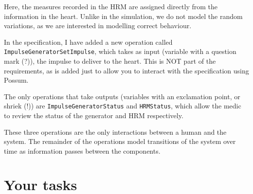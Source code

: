 \documentclass{article}
\begin{document}
Here, the measures recorded in the HRM are assigned directly from the information in the heart. Unlike in the simulation, we do not model the random variations, as we are interested in modelling correct behaviour.

In the specification, I have added a new operation called \texttt{ImpulseGeneratorSetImpulse}, which takes as input (variable with a question mark (?)), the impulse to deliver to the heart. This is NOT part of the requirements, as is added just to allow you to interact with the specification using Possum.

The only operations that take outputs (variables with an exclamation point, or shriek (!)) are \texttt{ImpulseGeneratorStatus} and \texttt{HRMStatus}, which allow the medic to review the status of the generator and HRM respectively.

These three operations are the only interactions between a human and the system.  The remainder of the operations model transitions of the system over time as information passes between the components.

\section*{Your tasks}
\end{document}
